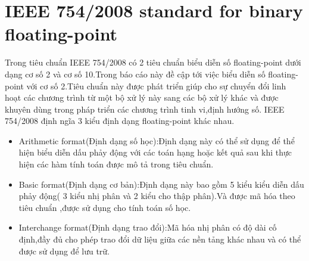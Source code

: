 \documentclass[11pt,a4paper,vietnamese]{report}
\begin{document}
\chapter{IEEE 754/2008 standard for binary floating-point}
Trong tiêu chuẩn IEEE 754/2008 có 2 tiêu chuẩn biểu diễn số floating-point dưới dạng cơ số 2 và cơ số 10.Trong báo cáo này đề cập tới việc biểu diễn số floating-point với cơ số 2.Tiêu chuẩn này được phát triển giúp cho sự chuyển đổi linh hoạt các chương trình từ một bộ xử lý này sang các bộ xử lý khác và được khuyên dùng trong pháp triển các chương trình tinh vi,định hướng số.
IEEE 754/2008 định ngĩa 3 kiểu định dạng floating-point khác nhau.
\begin{itemize}
\item Arithmetic format(Định dạng số học):Định dạng này có thể sử dụng để thể hiện biểu diễn dấu phảy động với các toán hạng hoặc kết quả sau khi thực hiện các hàm tính toán được mô tả trong tiêu chuẩn.
\item Basic format(Định dạng cơ bản):Định dạng này bao gồm 5 kiểu kiểu diễn dấu phảy động( 3 kiểu nhị phân và 2 kiểu cho thập phân).Và được mã hóa theo tiêu chuẩn ,được sử dụng cho tính toán số học.
\item Interchange format(Định dạng trao đổi):Mã hóa nhị phân có độ dài cố định,đầy đủ cho phép trao đổi dữ liệu giữa các nền tảng khác nhau và có thể được sử dụng để lưu trữ.
\end{itemize}
\end{document}
